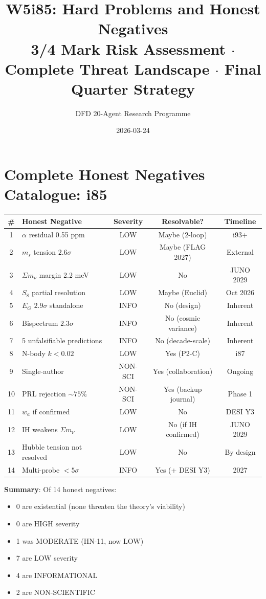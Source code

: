 \documentclass[11pt,a4paper]{article}
\title{W5i85: Hard Problems and Honest Negatives\\[6pt]
\large 3/4 Mark Risk Assessment $\cdot$ Complete Threat Landscape $\cdot$ Final Quarter Strategy}
\author{DFD 20-Agent Research Programme}
\date{2026-03-24}
\begin{document}
\maketitle

\section{Complete Honest Negatives Catalogue: i85}

\begin{center}
\begin{tabular}{clccc}
\toprule
\textbf{\#} & \textbf{Honest Negative} & \textbf{Severity} & \textbf{Resolvable?} & \textbf{Timeline} \\
\midrule
1 & $\alpha$ residual 0.55 ppm & LOW & Maybe (2-loop) & i93+ \\
2 & $m_s$ tension $2.6\sigma$ & LOW & Maybe (FLAG 2027) & External \\
3 & $\Sigma m_\nu$ margin 2.2 meV & LOW & No & JUNO 2029 \\
4 & $S_8$ partial resolution & LOW & Maybe (Euclid) & Oct 2026 \\
5 & $E_G$ $2.9\sigma$ standalone & INFO & No (design) & Inherent \\
6 & Bispectrum $2.3\sigma$ & INFO & No (cosmic variance) & Inherent \\
7 & 5 unfalsifiable predictions & INFO & No (decade-scale) & Inherent \\
8 & N-body $k < 0.02$ & LOW & Yes (P2-C) & i87 \\
9 & Single-author & NON-SCI & Yes (collaboration) & Ongoing \\
10 & PRL rejection $\sim 75\%$ & NON-SCI & Yes (backup journal) & Phase 1 \\
11 & $w_a$ if confirmed & LOW & No & DESI Y3 \\
12 & IH weakens $\Sigma m_\nu$ & LOW & No (if IH confirmed) & JUNO 2029 \\
13 & Hubble tension not resolved & LOW & No & By design \\
14 & Multi-probe $< 5\sigma$ & INFO & Yes (+ DESI Y3) & 2027 \\
\bottomrule
\end{tabular}
\end{center}

\textbf{Summary}: Of 14 honest negatives:
\begin{itemize}[nosep]
\item 0 are existential (none threaten the theory's viability)
\item 0 are HIGH severity
\item 1 was MODERATE (HN-11, now LOW)
\item 7 are LOW severity
\item 4 are INFORMATIONAL
\item 2 are NON-SCIENTIFIC
\end{itemize}
\end{document}
